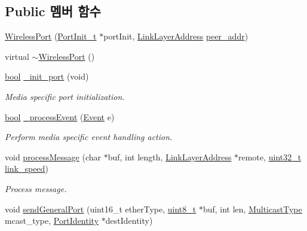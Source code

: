 \subsection*{Public 멤버 함수}
\begin{DoxyCompactItemize}
\item 
\hyperlink{class_wireless_port_a334a571629e980a524075a227b2d609b}{Wireless\+Port} (\hyperlink{struct_port_init__t}{Port\+Init\+\_\+t} $\ast$port\+Init, \hyperlink{class_link_layer_address}{Link\+Layer\+Address} \hyperlink{class_wireless_port_a2e3c335f16cf24c8ca44069a6c6149e0}{peer\+\_\+addr})
\item 
virtual \hyperlink{class_wireless_port_abf8d6db0123d540946ab94266cf32977}{$\sim$\+Wireless\+Port} ()
\item 
\hyperlink{avb__gptp_8h_af6a258d8f3ee5206d682d799316314b1}{bool} \hyperlink{class_wireless_port_a710efb6671511196439987e463499508}{\+\_\+init\+\_\+port} (void)
\begin{DoxyCompactList}\small\item\em Media specific port initialization. \end{DoxyCompactList}\item 
\hyperlink{avb__gptp_8h_af6a258d8f3ee5206d682d799316314b1}{bool} \hyperlink{class_wireless_port_a2b3fe2386d7d83b77610339ec7c5778d}{\+\_\+process\+Event} (\hyperlink{class_event}{Event} e)
\begin{DoxyCompactList}\small\item\em Perform media specific event handling action. \end{DoxyCompactList}\item 
void \hyperlink{class_wireless_port_a3a562fa917715c602f5b750f8d2bdc81}{process\+Message} (char $\ast$buf, int length, \hyperlink{class_link_layer_address}{Link\+Layer\+Address} $\ast$remote, \hyperlink{parse_8c_a6eb1e68cc391dd753bc8ce896dbb8315}{uint32\+\_\+t} \hyperlink{class_common_port_aae24fc4f200e75aa8215f797b2561dbf}{link\+\_\+speed})
\begin{DoxyCompactList}\small\item\em Process message. \end{DoxyCompactList}\item 
void \hyperlink{class_wireless_port_a9de15e5c639faaf04407f126e241358a}{send\+General\+Port} (uint16\+\_\+t ether\+Type, \hyperlink{stdint_8h_aba7bc1797add20fe3efdf37ced1182c5}{uint8\+\_\+t} $\ast$buf, int len, \hyperlink{avbts__message_8hpp_aee4ca524cb617678ed1bd2db2b56da42}{Multicast\+Type} mcast\+\_\+type, \hyperlink{class_port_identity}{Port\+Identity} $\ast$dest\+Identity)

\end{DoxyCompactItemize}
